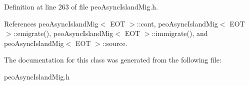 Definition at line 263 of file peo\-Async\-Island\-Mig.h.

References peo\-Async\-Island\-Mig$<$ EOT $>$::cont, peo\-Async\-Island\-Mig$<$ EOT $>$::emigrate(), peo\-Async\-Island\-Mig$<$ EOT $>$::immigrate(), and peo\-Async\-Island\-Mig$<$ EOT $>$::source.

The documentation for this class was generated from the following file:\begin{CompactItemize}
\item 
peo\-Async\-Island\-Mig.h\end{CompactItemize}
